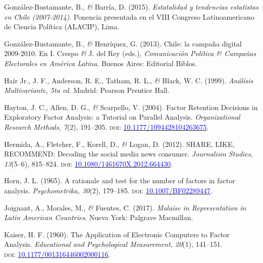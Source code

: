 \documentclass[a4paper]{tufte-handout}
\begin{document}
\begin{list}{}
\item{\small González-Bustamante, B., {\itshape \&} Barría, D. (2015). {\itshape Estatalidad y tendencias estatistas en Chile (2007-2014)}. Ponencia presentada en el VIII Congreso Latinoamericano de Ciencia Política (ALACIP), Lima.}

\item{\small González-Bustamante, B., {\itshape \&} Henríquez, G. (2013). Chile: la campaña digital 2009-2010. En I. Crespo {\itshape \&} J. del Rey (eds.), {\itshape Comunicación Política \& Campañas Electorales en América Latina}. Buenos Aires: Editorial Biblos.}

\item{\small Hair Jr., J. F., Anderson, R. E., Tatham, R. L., {\itshape \&} Black, W. C. (1999). {\itshape Análisis Multivariante, 5ta ed}. Madrid: Pearson Prentice Hall.}

\item{\small Hayton, J. C., Allen, D. G., {\itshape \&} Scarpello, V. (2004). Factor Retention Decisions in Exploratory Factor Analysis: a Tutorial on Parallel Analysis. {\itshape Organizational Research Methods, 7}(2), 191--205. {\scshape doi:} \href{https://doi.org/10.1177/1094428104263675}{\textcolor{blue}{10.1177/1094428104263675}}.}

\item{\small Hermida, A., Fletcher, F., Korell, D., {\itshape \&} Logan, D. (2012). SHARE, LIKE, RECOMMEND: Decoding the social media news consumer. {\itshape Journalism Studies, 13}(5--6), 815--824. {\scshape doi:} \href{https://doi.org/10.1080/1461670X.2012.664430}{\textcolor{blue}{10.1080/1461670X.2012.664430}}.}

\item{\small Horn, J. L. (1965). A rationale and test for the number of factors in factor analysis. {\itshape Psychometrika, 30}(2), 179--185. {\scshape doi:} \href{https://doi.org/10.1007/BF02289447}{\textcolor{blue}{10.1007/BF02289447}}.}

\item{\small Joignant, A., Morales, M., {\itshape \&} Fuentes, C. (2017). {\itshape Malaise in Representation in Latin American Countries}. Nueva York: Palgrave Macmillan.}

\item{\small Kaiser, H. F. (1960). The Application of Electronic Computers to Factor Analysis. {\itshape Educational and Psychological Measurement, 20}(1), 141--151. \\ {\scshape doi:} \href{https://doi.org/10.1177/001316446002000116}{\textcolor{blue}{10.1177/001316446002000116}}.}


\end{list}
\end{document}
